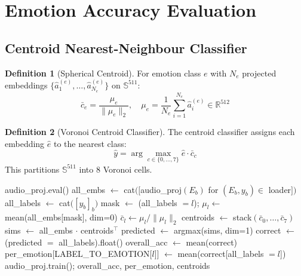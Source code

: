 \documentclass[12pt,a4paper]{article}
\theoremstyle{definition}
\newtheorem{definition}{Definition}[section]
\theoremstyle{plain}
\theoremstyle{remark}
\begin{document}
\section{Emotion Accuracy Evaluation}
\label{sec:eval}

\subsection{Centroid Nearest-Neighbour Classifier}

\begin{definition}[Spherical Centroid]
For emotion class $e$ with $N_e$ projected embeddings
$\{\hat{a}_1^{(e)},\ldots,\hat{a}_{N_e}^{(e)}\}$ on $\mathbb{S}^{511}$:
\[
  \bar{c}_e = \frac{\mu_e}{\|\mu_e\|_2},
  \quad \mu_e = \frac{1}{N_e}\sum_{i=1}^{N_e}\hat{a}_i^{(e)} \in\mathbb{R}^{512}
\]
\end{definition}

\begin{definition}[Voronoi Centroid Classifier]
The centroid classifier assigns each embedding $\hat{e}$ to the nearest class:
\[
  \hat{y} = \arg\max_{c\in\{0,\ldots,7\}} \hat{e}\cdot\bar{c}_c
\]
This partitions $\mathbb{S}^{511}$ into 8 Voronoi cells.
\end{definition}

\begin{algorithm}[H]
\caption{Evaluate Emotion Accuracy (Centroid-NN)}
\label{alg:eval}
\begin{algorithmic}[1]
\State audio\_proj.eval()
\State all\_embs $\gets$ cat$\bigl([$audio\_proj$(E_b)$ for $(E_b,y_b)\in$ loader$]\bigr)$ \Comment{$[N,512]$}
\State all\_labels $\gets$ cat$\bigl([y_b]_{b}\bigr)$ \Comment{$[N]$}
  \State mask $\gets$ (all\_labels $= l$); $\mu_l\gets$ mean(all\_embs[mask], dim=0)
  \State $\bar{c}_l \gets \mu_l/\|\mu_l\|_2$ 
\EndFor
\State centroids $\gets$ stack$(\bar{c}_0,\ldots,\bar{c}_7)$ \Comment{$[8,512]$}
\State sims $\gets$ all\_embs $\cdot$ centroids$^\top$ 
\State predicted $\gets$ argmax(sims, dim=1) \Comment{$[N]$}
\State correct $\gets$ (predicted $=$ all\_labels).float()
\State overall\_acc $\gets$ mean(correct)
  \State per\_emotion[LABEL\_TO\_EMOTION[$l$]] $\gets$ mean(correct[all\_labels $= l$])
\EndFor
\State audio\_proj.train(); \Return overall\_acc, per\_emotion, centroids
\end{algorithmic}
\end{algorithm}
\end{document}
